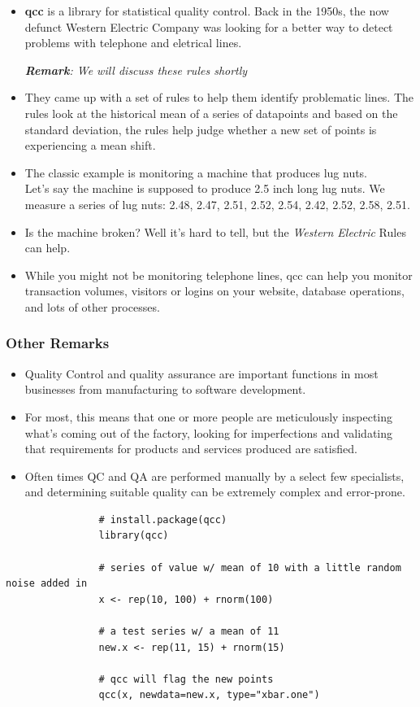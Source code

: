 \documentclass[]{report}
\begin{document}
{\large
	\begin{itemize}
		\item \textbf{qcc} is a library for statistical quality control. Back in the 1950s, the now defunct Western Electric Company was looking for a better way to detect problems with telephone and eletrical lines.
		
		\subitem \textit{\textbf{Remark}: We will discuss these rules shortly}
		
		\item They came up with a set of rules to help them identify problematic lines. The rules look at the historical mean of a series of datapoints and based on the standard deviation, the rules help judge whether a new set of points is experiencing a mean shift.
		
		\item The classic example is monitoring a machine that produces lug nuts. \\ Let's say the machine is supposed to produce 2.5 inch long lug nuts. We measure a series of lug nuts: 2.48, 2.47, 2.51, 2.52, 2.54, 2.42, 2.52, 2.58, 2.51. \item  Is the machine broken? Well it's hard to tell, but the \textit{Western Electric} Rules can help.
		
		\item While you might not be monitoring telephone lines, qcc can help you monitor transaction volumes, visitors or logins on your website, database operations, and lots of other processes.
	\end{itemize}}
	\newpage
	\subsubsection{Other Remarks}
	{\large
		\begin{itemize}
			\item Quality Control and quality assurance are important functions in most businesses from manufacturing to software development. 
			\item For most, this means that one or more people are meticulously inspecting what's coming out of the factory, looking for imperfections and validating that requirements for products and services produced are satisfied. \item Often times QC and QA are performed manually by a select few specialists, and determining suitable quality can be extremely complex and error-prone.
		\end{itemize}}
		\newpage
		{
			\large
			\begin{framed}
				\begin{verbatim}
				# install.package(qcc)
				library(qcc)
				
				# series of value w/ mean of 10 with a little random noise added in
				x <- rep(10, 100) + rnorm(100)
				
				# a test series w/ a mean of 11
				new.x <- rep(11, 15) + rnorm(15)
				
				# qcc will flag the new points
				qcc(x, newdata=new.x, type="xbar.one")
				\end{verbatim}
			\end{framed}
		}
		
\end{document}
